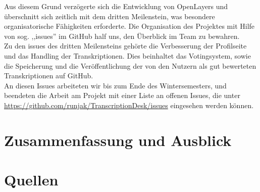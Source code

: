 \documentclass{article}
\begin{document}
Aus diesem Grund verzögerte sich die Entwicklung von OpenLayers und überschnitt sich zeitlich mit dem dritten Meilenstein, 
was besondere organisatorische Fähigkeiten erforderte.
Die Organisation des Projektes mit Hilfe von sog. ,,issues'' im GitHub half uns, den Überblick im Team zu bewahren.\\
Zu den issues des dritten Meilensteins gehörte die Verbesserung der Profilseite und das Handling der Transkriptionen.
Dies beinhaltet das Votingsystem, sowie die Speicherung und die Veröffentlichung der von den Nutzern als gut bewerteten Transkriptionen auf GitHub.\\
An diesen Issues arbeiteten wir bis zum Ende des Wintersemesters, und beendeten die Arbeit am Projekt mit einer Liste an offenen Issues,
die unter \url{https://github.com/runjak/TranscriptionDesk/issues} eingesehen werden können.

\section{Zusammenfassung und Ausblick}

\section*{Quellen}
  \printbibliography[%
    heading=bibintoc, %
  ]
\end{document}
